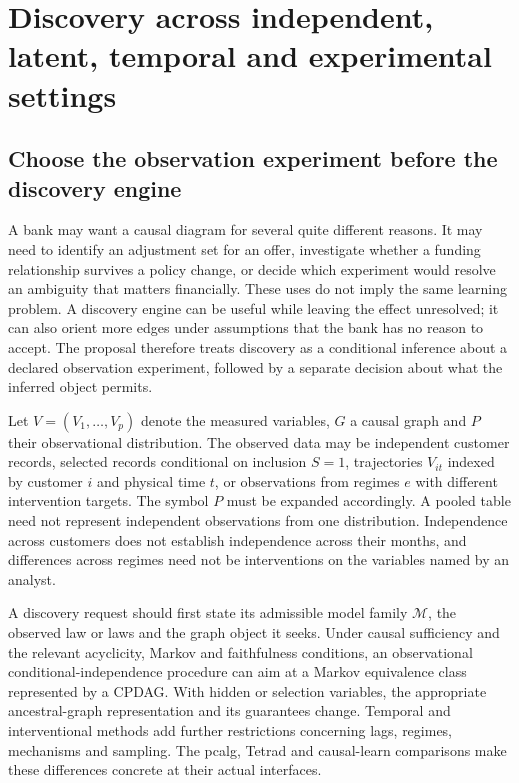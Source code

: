 \chapter{Discovery across independent, latent, temporal and experimental settings}
\label{exec16:s2}

\section{Choose the observation experiment before the discovery engine}

A bank may want a causal diagram for several quite different reasons. It may
need to identify an adjustment set for an offer, investigate whether a funding
relationship survives a policy change, or decide which experiment would resolve
an ambiguity that matters financially. These uses do not imply the same
learning problem. A discovery engine can be useful while leaving the effect
unresolved; it can also orient more edges under assumptions that the bank has
no reason to accept. The proposal therefore treats discovery as a conditional
inference about a declared observation experiment, followed by a separate
decision about what the inferred object permits.

Let $V=(V_1,\ldots,V_p)$ denote the measured variables, $G$ a causal graph and
$P$ their observational distribution. The observed data may be independent
customer records, selected records conditional on inclusion $S=1$, trajectories
$V_{it}$ indexed by customer $i$ and physical time $t$, or observations from
regimes $e$ with different intervention targets. The symbol $P$ must be expanded
accordingly. A pooled table need not represent independent observations from
one distribution. Independence across customers does not establish independence
across their months, and differences across regimes need not be interventions
on the variables named by an analyst.

A discovery request should first state its admissible model family
$\mathcal M$, the observed law or laws and the graph object it seeks. Under
causal sufficiency and the relevant acyclicity, Markov and faithfulness
conditions, an observational conditional-independence procedure can aim at a
Markov equivalence class represented by a CPDAG. With hidden or selection
variables, the appropriate ancestral-graph representation and its guarantees
change. Temporal and interventional methods add further restrictions concerning
lags, regimes, mechanisms and sampling. The pcalg, Tetrad and causal-learn
comparisons make these differences concrete at their actual interfaces.
\citep{exec13_pcalg,exec13_java_tetrad,exec13_pydisc_causallearn,exec13_latentr_colombo2012}

